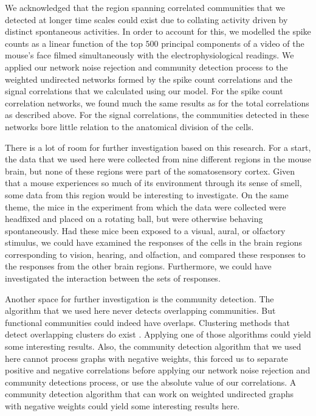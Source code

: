 We acknowledged that the region spanning correlated communities that we detected at longer time scales could exist due to collating activity driven by distinct spontaneous activities. In order to account for this, we modelled the spike counts as a linear function of the top $500$ principal components of a video of the mouse's face filmed simultaneously with the electrophysiological readings. We applied our network noise rejection and community detection process to the weighted undirected networks formed by the spike count correlations and the signal correlations that we calculated using our model. For the spike count correlation networks, we found much the same results as for the total correlations as described above. For the signal correlations, the communities detected in these networks bore little relation to the anatomical division of the cells.

There is a lot of room for further investigation based on this research. For a start, the data that we used here were collected from nine different regions in the mouse brain, but none of these regions were part of the somatosensory cortex. Given that a mouse experiences so much of its environment through its sense of smell, some data from this region would be interesting to investigate. On the same theme, the mice in the experiment from which the data were collected were headfixed and placed on a rotating ball, but were otherwise behaving spontaneously. Had these mice been exposed to a visual, aural, or olfactory stimulus, we could have examined the responses of the cells in the brain regions corresponding to vision, hearing, and olfaction, and compared these responses to the responses from the other brain regions. Furthermore, we could have investigated the interaction between the sets of responses.

Another space for further investigation is the community detection. The algorithm that we used here never detects overlapping communities. But functional communities could indeed have overlaps. Clustering methods that detect overlapping clusters do exist \parencite{baadel}. Applying one of those algorithms could yield some interesting results. Also, the community detection algorithm that we used here cannot process graphs with negative weights, this forced us to separate positive and negative correlations before applying our network noise rejection and community detections process, or use the absolute value of our correlations. A community detection algorithm that can work on weighted undirected graphs with negative weights could yield some interesting results here.

